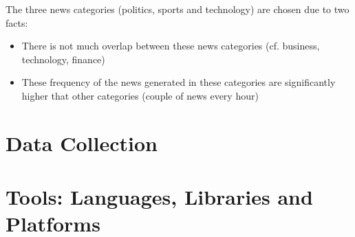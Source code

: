 \documentclass{llncs}
\begin{document}
The three news categories (politics, sports and technology) are chosen due to two facts:
\begin{itemize}
\item There is not much overlap between these news categories (cf. business, technology, finance)
\item These frequency of the news generated in these categories are significantly higher that other categories (couple of news every hour)
\end{itemize}

\section{Data Collection}
\section{Tools: Languages, Libraries and Platforms}
\begin{thebibliography}
\bibitem
\end{thebibliography}
\end{document}

